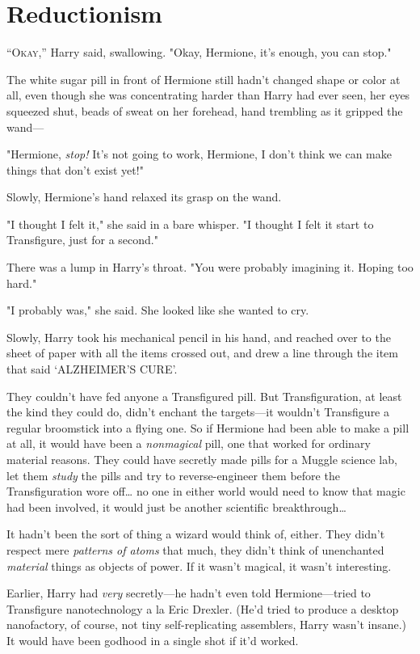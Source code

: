 \chapter{Reductionism}

\lettrine{“O}{kay},'' Harry said, swallowing. "Okay, Hermione, it's enough, you can stop."

The white sugar pill in front of Hermione still hadn't changed shape or color 
at all, even though she was concentrating harder than Harry had ever seen, her 
eyes squeezed shut, beads of sweat on her forehead, hand trembling as it 
gripped the wand---

"Hermione, \emph{stop!} It's not going to work, Hermione, I don't think we can 
make things that don't exist yet!"

Slowly, Hermione's hand relaxed its grasp on the wand.

"I thought I felt it," she said in a bare whisper. "I thought I felt it start 
to Transfigure, just for a second."

There was a lump in Harry's throat. "You were probably imagining it. Hoping too 
hard."

"I probably was," she said. She looked like she wanted to cry.

Slowly, Harry took his mechanical pencil in his hand, and reached over to the 
sheet of paper with all the items crossed out, and drew a line through the item 
that said `ALZHEIMER'S CURE'.

They couldn't have fed anyone a Transfigured pill. But Transfiguration, at 
least the kind they could do, didn't enchant the targets---it wouldn't 
Transfigure a regular broomstick into a flying one. So if Hermione had been 
able to make a pill at all, it would have been a \emph{nonmagical} pill, one 
that worked for ordinary material reasons. They could have secretly made pills 
for a Muggle science lab, let them \emph{study} the pills and try to 
reverse-engineer them before the Transfiguration wore off{\ldots} no one in 
either world would need to know that magic had been involved, it would just be 
another scientific breakthrough{\ldots}

It hadn't been the sort of thing a wizard would think of, either. They didn't 
respect mere \emph{patterns of atoms} that much, they didn't think of 
unenchanted \emph{material} things as objects of power. If it wasn't magical, 
it wasn't interesting.

Earlier, Harry had \emph{very} secretly---he hadn't even told Hermione---tried 
to Transfigure nanotechnology a la Eric Drexler. (He'd tried to produce a 
desktop nanofactory, of course, not tiny self-replicating assemblers, Harry 
wasn't insane.) It would have been godhood in a single shot if it'd worked.

